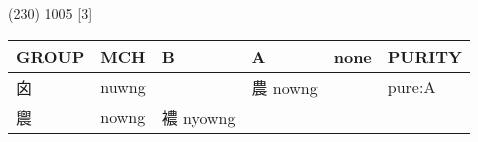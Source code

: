 \documentclass[14pt,a4paper]{scrartcl}
\begin{document}
(230) 1005 {[}3{]}

\begin{longtable}[c]{@{}llllll@{}}
\toprule
\begin{minipage}[b]{0.14\columnwidth}\raggedright\strut
GROUP
\strut\end{minipage} &
\begin{minipage}[b]{0.14\columnwidth}\raggedright\strut
MCH
\strut\end{minipage} &
\begin{minipage}[b]{0.14\columnwidth}\raggedright\strut
B
\strut\end{minipage} &
\begin{minipage}[b]{0.14\columnwidth}\raggedright\strut
A
\strut\end{minipage} &
\begin{minipage}[b]{0.14\columnwidth}\raggedright\strut
none
\strut\end{minipage} &
\begin{minipage}[b]{0.14\columnwidth}\raggedright\strut
PURITY
\strut\end{minipage}\tabularnewline
\midrule
\endhead
\begin{minipage}[t]{0.14\columnwidth}\raggedright\strut
囟
\strut\end{minipage} &
\begin{minipage}[t]{0.14\columnwidth}\raggedright\strut
nuwng
\strut\end{minipage} &
\begin{minipage}[t]{0.14\columnwidth}\raggedright\strut
\strut\end{minipage} &
\begin{minipage}[t]{0.14\columnwidth}\raggedright\strut
農 nowng
\strut\end{minipage} &
\begin{minipage}[t]{0.14\columnwidth}\raggedright\strut
\strut\end{minipage} &
\begin{minipage}[t]{0.14\columnwidth}\raggedright\strut
pure:A
\strut\end{minipage}\tabularnewline
\begin{minipage}[t]{0.14\columnwidth}\raggedright\strut
䢉
\strut\end{minipage} &
\begin{minipage}[t]{0.14\columnwidth}\raggedright\strut
nowng
\strut\end{minipage} &
\begin{minipage}[t]{0.14\columnwidth}\raggedright\strut
襛 nyowng
\strut\end{minipage} &

\end{longtable}
\end{document}

